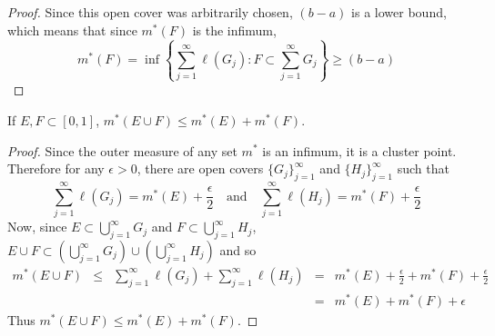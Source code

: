 \begin{pblm}
\begin{proof}
	Since this open cover was arbitrarily chosen, $(b - a)$ is a lower bound, which means that since $m^\ast(F)$ is 
	the infimum, 
	\begin{equation*}
		m^\ast(F) = \inf\left\{\sum\limits_{j=1}^\infty\ell(G_j):F\subset\sum\limits_{j=1}^\infty G_j\right\} \ge (b - a)
	\end{equation*}
\end{proof}
\end{pblm}

\begin{pblm}%
	If $E,F \subset [0,1]$, $m^\ast(E\cup F) \le m^\ast(E) + m^\ast(F)$. 
\begin{proof}
	Since the outer measure of any set $m^\ast$ is an infimum, it is a cluster 
	point. Therefore for any $\epsilon > 0$, there are open covers $\{G_j\}_{j=1}^\infty$ 
	and $\{H_j\}_{j=1}^\infty$ such that 
	\begin{equation*}
		\sum\limits_{j=1}^\infty\ell(G_j) = m^\ast(E) + \frac{\epsilon}{2} ~~~\text{ and }~~~ 
		\sum\limits_{j=1}^\infty\ell(H_j) = m^\ast(F) + \frac{\epsilon}{2}
	\end{equation*}
	Now, since $E \subset \bigcup\limits_{j=1}^\infty G_j$ and $F \subset \bigcup\limits_{j=1}^\infty H_j$, 
	$ E \cup F \subset \left(\bigcup\limits_{j=1}^\infty G_j\right) \cup \left(\bigcup\limits_{j=1}^\infty H_j\right)$ 
	and so 
	\begin{equation*}
		\begin{array}{rcccl}
			m^\ast(E \cup F) & \le & \sum\limits_{j=1}^\infty\ell(G_j) + \sum\limits_{j=1}^\infty\ell(H_j) 
					& = & m^\ast(E) + \frac{\epsilon}{2} + m^\ast(F) + \frac{\epsilon}{2}\\
					& & & = & m^\ast(E) + m^\ast(F) + \epsilon
		\end{array}
	\end{equation*}
	Thus $m^\ast(E\cup F) \le m^\ast(E) + m^\ast(F)$. 
\end{proof}
\end{pblm}

